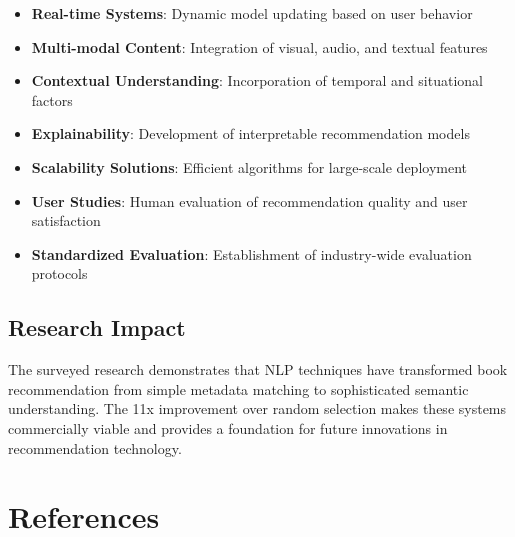 \documentclass[12pt,a4paper]{article}
\begin{document}
\begin{itemize}
    \item \textbf{Real-time Systems}: Dynamic model updating based on user behavior
    \item \textbf{Multi-modal Content}: Integration of visual, audio, and textual features
    \item \textbf{Contextual Understanding}: Incorporation of temporal and situational factors
    \item \textbf{Explainability}: Development of interpretable recommendation models
    \item \textbf{Scalability Solutions}: Efficient algorithms for large-scale deployment
    \item \textbf{User Studies}: Human evaluation of recommendation quality and user satisfaction
    \item \textbf{Standardized Evaluation}: Establishment of industry-wide evaluation protocols
\end{itemize}

\subsection{Research Impact}
The surveyed research demonstrates that NLP techniques have transformed book recommendation from simple metadata matching to sophisticated semantic understanding. The 11x improvement over random selection makes these systems commercially viable and provides a foundation for future innovations in recommendation technology.


\section{References}
\end{document}
